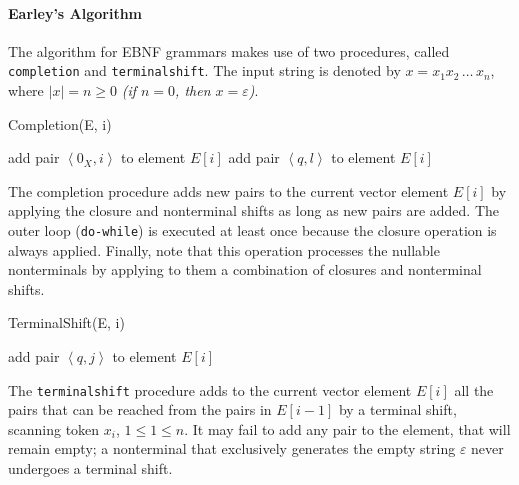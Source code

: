 \paragraph*{Earley's Algorithm}
The algorithm for EBNF grammars makes use of two procedures, called \texttt{completion} and \texttt{terminalshift}.
The input string is denoted by $x = x_1 x_2 \,\ldots\, x_n$, where $|x| = n \geq 0$ \textit{(if $n = 0$, then $x = \varepsilon$)}.
\begin{algorithm}[H]
  \caption{Completion(E, i)}
      \begin{algorithmic}[1]
                  \State add pair $\left\langle 0_X,i \right\rangle$ to element $E[i]$
              \EndFor
                      \State add pair $\left\langle q,l \right\rangle$ to element $E[i]$
                  \EndFor
              \EndFor
          \EndWhile 
      \end{algorithmic}
\end{algorithm}
The completion procedure adds new pairs to the current vector element $E[i]$ by applying the closure and nonterminal shifts as long as new pairs are added.
The outer loop (\texttt{do-while}) is executed at least once because the closure operation is always applied.
Finally, note that this operation processes the nullable nonterminals by applying to them a combination of closures and nonterminal shifts.
\begin{algorithm}[H]
  \caption{TerminalShift(E, i)}
      \begin{algorithmic}[1]
              \State add pair $\left\langle q,j \right\rangle$ to element $E[i]$
          \EndFor
      \end{algorithmic}
\end{algorithm}
The \texttt{terminalshift} procedure adds to the current vector element $E[i]$ all the pairs that can be reached from the pairs in $E[i-1]$ by a terminal shift, scanning token $x_i$, $1 \leq 1 \leq n$.
It may fail to add any pair to the element, that will remain empty; a nonterminal that exclusively generates the empty string $\varepsilon$ never undergoes a terminal shift.

